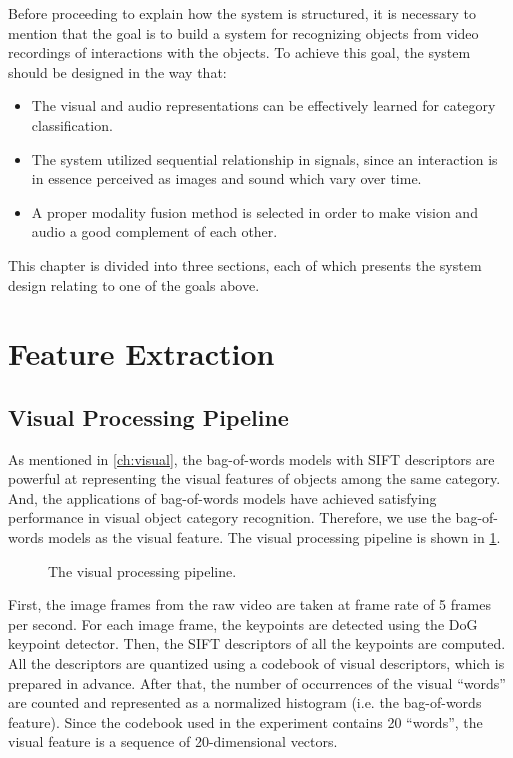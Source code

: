 \documentclass[12pt,final,twoside]{report}
\theoremstyle{plain}
\theoremstyle{definition}
\theoremstyle{remark}
\newcommand{\includetexfig}[1]{}
\begin{document}
Before proceeding to explain how the system is structured, it is necessary to mention that the goal is to build a system for recognizing objects from video recordings of interactions with the objects. To achieve this goal, the system should be designed in the way that:
\begin{itemize}
  \item The visual and audio representations can be effectively learned for category classification.
  \item The system utilized sequential relationship in signals, since an interaction is in essence perceived as images and sound which vary over time.
  \item A proper modality fusion method is selected in order to make vision and audio a good complement of each other.
\end{itemize}

This chapter is divided into three sections, each of which presents the system design relating to one of the goals above.

\section{Feature Extraction}
\subsection{Visual Processing Pipeline}
As mentioned in \cref{ch:visual}, the bag-of-words models with SIFT descriptors are powerful at representing the visual features of objects among the same category. And, the applications of bag-of-words models have achieved satisfying performance in visual object category recognition. Therefore, we use the bag-of-words models as the visual feature. The visual processing pipeline is shown in \cref{fig:vpipe}. 

\begin{figure}[t]
  \centering
  \includetexfig{vpipe}
  \caption{The visual processing pipeline.}
  \label{fig:vpipe}
\end{figure}

First, the image frames from the raw video are taken at frame rate of 5 frames per second. For each image frame, the keypoints are detected using the DoG keypoint detector. Then, the SIFT descriptors of all the keypoints are computed. All the descriptors are quantized using a codebook of visual descriptors, which is prepared in advance. After that, the number of occurrences of the visual ``words'' are counted and represented as a normalized histogram (i.e. the bag-of-words feature). Since the codebook used in the experiment contains 20 ``words'', the visual feature is a sequence of 20-dimensional vectors.
\end{document}
